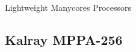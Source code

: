 \begin{frame}[fragile, t]{Lightweight Manycores Processors}

	\end{frame}

	\subsection{Kalray MPPA-256}

